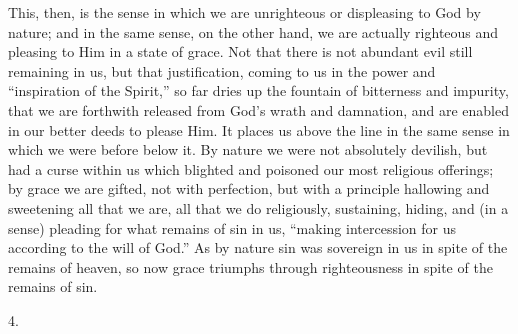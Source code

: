 This, then, is the sense in which we are unrighteous or displeasing
to God by nature; and in the same sense, on the other hand, we are
actually righteous and pleasing to Him in a state of grace. Not that
there is not abundant evil still remaining in us, but that
justification, coming to us in the power and ``inspiration of the
Spirit,'' so far dries up the fountain of bitterness and
impurity, that we are forthwith released from God's wrath and
damnation, and are enabled in our better deeds to please Him. It
places us above the line in the same sense in which we were before
below it. By nature we were not absolutely devilish, but had a curse
within us which blighted and poisoned our most religious offerings; by
grace we are gifted, not with perfection, but with a principle
hallowing and sweetening all that we are, all that we do religiously,
sustaining, hiding, and (in a sense) pleading for what remains of sin
in us, ``making intercession for us according to the will of
God.'' As by nature sin was sovereign in us in spite of the
remains of heaven, so now grace triumphs through righteousness in
spite of the remains of sin.

4.

